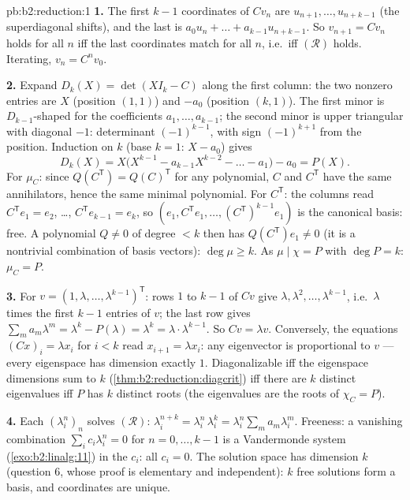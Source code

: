 \begin{solution}{pb:b2:reduction:1}
\textbf{1.} The first $k - 1$ coordinates of $Cv_n$ are $u_{n+1},
\dots, u_{n+k-1}$ (the superdiagonal shifts), and the last is
$a_0 u_n + \dots + a_{k-1}u_{n+k-1}$. So $v_{n+1} = Cv_n$ holds
for all $n$ iff the last coordinates match for all $n$, i.e.\ iff
$(\mathcal R)$ holds. Iterating, $v_n = C^nv_0$.

\textbf{2.} Expand $D_k(X) = \det(XI_k - C)$ along the first
column: the two nonzero entries are $X$ (position $(1,1)$) and
$-a_0$ (position $(k,1)$). The first minor is $D_{k-1}$-shaped
for the coefficients $a_1, \dots, a_{k-1}$; the second minor is
upper triangular with diagonal $-1$: determinant $(-1)^{k-1}$,
with sign $(-1)^{k+1}$ from the position. Induction on $k$
(base $k = 1$: $X - a_0$) gives
\[
D_k(X) = X\bigl(X^{k-1} - a_{k-1}X^{k-2} - \dots - a_1\bigr) -
a_0 = P(X).
\]
For $\mu_C$: since $Q(C^{\mathsf T}) = Q(C)^{\mathsf T}$ for any
polynomial, $C$ and $C^{\mathsf T}$ have the same annihilators,
hence the same minimal polynomial. For $C^{\mathsf T}$: the
columns read $C^{\mathsf T}e_1 = e_2$, \dots, $C^{\mathsf
T}e_{k-1} = e_k$, so $(e_1, C^{\mathsf T}e_1, \dots, (C^{\mathsf
T})^{k-1}e_1)$ is the canonical basis: free. A polynomial $Q
\neq 0$ of degree $< k$ then has $Q(C^{\mathsf T})e_1 \neq 0$
(it is a nontrivial combination of basis vectors): $\deg\mu \geq
k$. As $\mu \mid \chi = P$ with $\deg P = k$: $\mu_C = P$.

\textbf{3.} For $v = (1, \lambda, \dots, \lambda^{k-1})^{\mathsf
T}$: rows $1$ to $k-1$ of $Cv$ give $\lambda, \lambda^2, \dots,
\lambda^{k-1}$, i.e.\ $\lambda$ times the first $k - 1$ entries
of $v$; the last row gives $\sum_m a_m\lambda^m = \lambda^k -
P(\lambda) = \lambda^k = \lambda\cdot\lambda^{k-1}$. So $Cv =
\lambda v$. Conversely, the equations $(Cx)_i = \lambda x_i$ for
$i < k$ read $x_{i+1} = \lambda x_i$: any eigenvector is
proportional to $v$ --- every eigenspace has dimension exactly
$1$. Diagonalizable iff the eigenspace dimensions sum to $k$
(\cref{thm:b2:reduction:diagcrit}) iff there are $k$ distinct
eigenvalues iff $P$ has $k$ distinct roots (the eigenvalues are
the roots of $\chi_C = P$).

\textbf{4.} Each $(\lambda_i^n)_n$ solves $(\mathcal R)$:
$\lambda_i^{n+k} = \lambda_i^n\,\lambda_i^k =
\lambda_i^n\sum_m a_m\lambda_i^m$. Freeness: a vanishing
combination $\sum_i c_i\lambda_i^n = 0$ for $n = 0, \dots, k-1$
is a Vandermonde system (\cref{exo:b2:linalg:11}) in the $c_i$:
all $c_i = 0$. The solution space has dimension $k$ (question 6,
whose proof is elementary and independent): $k$ free solutions
form a basis, and coordinates are unique.


\end{solution}
